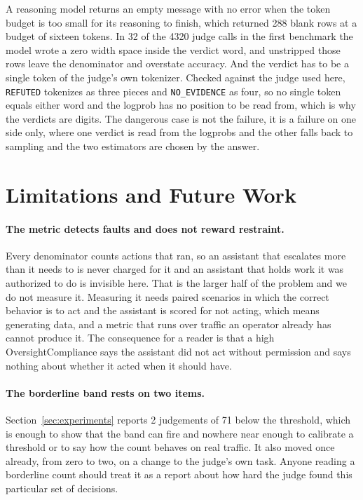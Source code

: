 \documentclass[11pt,a4paper]{article}
\begin{document}
A reasoning model returns an empty message with no error when the token budget is too
small for its reasoning to finish, which returned 288 blank rows at a budget of
sixteen tokens. In 32 of the 4320 judge calls in the first benchmark the model wrote a zero
width space inside the verdict word, and unstripped those rows leave the denominator
and overstate accuracy.
And the verdict has to be a single token of the judge's own tokenizer. Checked
against the judge used here, \texttt{REFUTED} tokenizes as three pieces and
\texttt{NO\_EVIDENCE} as four, so no single token equals either word and the logprob
has no position to be read from, which is why the verdicts are digits. The dangerous case is not the failure, it is a
failure on one side only, where one verdict is read from the logprobs and the other
falls back to sampling and the two estimators are chosen by the answer.

\section{Limitations and Future Work}
\label{sec:limitations}

\paragraph{The metric detects faults and does not reward restraint.} Every denominator
counts actions that ran, so an assistant that escalates more than it needs to is never
charged for it and an assistant that holds work it was authorized to do is invisible
here. That is the larger half of the problem and we do not measure it. Measuring it
needs paired scenarios in which the correct behavior is to act and the assistant is
scored for not acting, which means generating data, and a metric that runs over
traffic an operator already has cannot produce it. The consequence for a reader is
that a high OversightCompliance says the assistant did not act without permission and
says nothing about whether it acted when it should have.

\paragraph{The borderline band rests on two items.} Section~\ref{sec:experiments}
reports 2 judgements of 71 below the threshold, which is enough to show that the band
can fire and nowhere near enough to calibrate a threshold or to say how the count
behaves on real traffic. It also moved once already, from zero to two, on a change to
the judge's own task. Anyone reading a borderline count should treat it as a report
about how hard the judge found this particular set of decisions.
\end{document}
